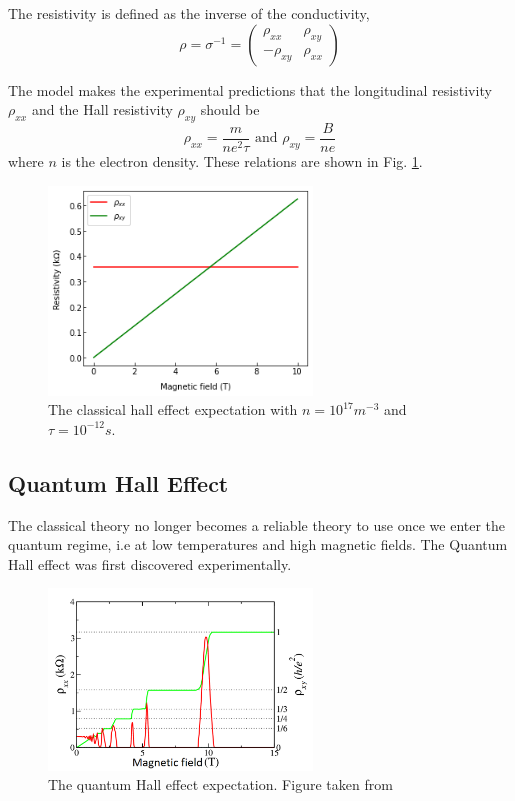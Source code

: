 The resistivity is defined as the inverse of the conductivity,
\begin{equation}
    \rho = \sigma^{-1} =
    \begin{pmatrix}
    \rho_{xx} & \rho_{xy}  \\
    -\rho_{xy} & \rho_{xx} 
    \end{pmatrix}
\end{equation}

The model makes the experimental predictions that the longitudinal resistivity $\rho_{xx}$ and the Hall resistivity $\rho_{xy}$ should be 
\begin{equation}
    \rho_{xx} = \frac{m}{n e^{2} \tau} \mbox{ and } \rho_{xy} = \frac{B}{ne}
\end{equation}
where $n$ is the electron density. These relations are shown in Fig. \ref{classical-resistivities}.

\begin{figure}[h!]
    \centering
    \includegraphics[width=7cm]{figures/classical hall effect rhovsB 2.png}
    \caption{The classical hall effect expectation with $n= 10^{17} m^{-3}$ and $\tau = 10^{-12} s$.}
    \label{classical-resistivities}
\end{figure}

\subsection{Quantum Hall Effect}
The classical theory no longer becomes a reliable theory to use once we enter the quantum regime, i.e at low temperatures and high magnetic fields. The Quantum Hall effect was first discovered experimentally. 

\begin{figure}[h!]
    \centering
    \includegraphics[width=7cm]{figures/quantum hall effect rhovsB.png} 
    \caption{The quantum Hall effect expectation. Figure taken from \cite{qhe-plot}}
    \label{quantum-hall-res}
\end{figure}

